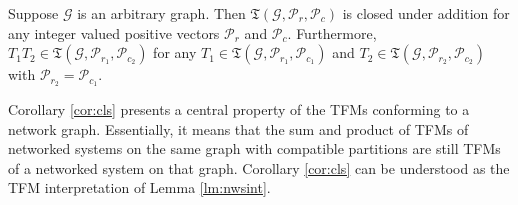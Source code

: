 \begin{cor}\cite{naghnaeian2019youla}
\label{cor:cls}
Suppose $\mathcal{G}$ is an arbitrary graph. Then $\mathfrak{T} \left( \mathcal{G}, \mathcal{P}_r,\mathcal{P}_c\right) $ is closed under addition for any integer valued positive vectors $\mathcal{P}_r$ and $\mathcal{P}_c$.
Furthermore, $ T_1 T_2 \in \mathfrak{T}\left( \mathcal{G}, \mathcal{P}_{r_1}, \mathcal{P}_{c_2}\right)$ for any $T_1\in \mathfrak{T}\left( \mathcal{G}, \mathcal{P}_{r_1}, \mathcal{P}_{c_1}\right) $ and $T_2\in \mathfrak{T}\left(\mathcal{G}, \mathcal{P}_{r_2}, \mathcal{P}_{c_2}\right) $ with $\mathcal{P}_{r_2} =\mathcal{P}_{c_1} $. 
\end{cor}
Corollary \ref{cor:cls} presents a central property of the TFMs conforming to a network graph. Essentially, it means that the sum and product of TFMs of networked systems on the same graph with compatible partitions are still TFMs of a networked system on that graph. Corollary \ref{cor:cls} can be understood as the TFM interpretation of Lemma \ref{lm:nwsint}.



